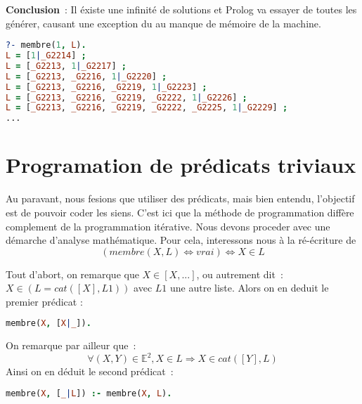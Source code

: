 \textbf{Conclusion}~: Il éxiste une infinité de solutions et Prolog va essayer
de toutes les générer, causant une exception du au manque de mémoire de la
machine.

\begin{lstlisting}[language=Prolog,frame=single]
?- membre(1, L).
L = [1|_G2214] ;
L = [_G2213, 1|_G2217] ;
L = [_G2213, _G2216, 1|_G2220] ;
L = [_G2213, _G2216, _G2219, 1|_G2223] ;
L = [_G2213, _G2216, _G2219, _G2222, 1|_G2226] ;
L = [_G2213, _G2216, _G2219, _G2222, _G2225, 1|_G2229] ;
...
\end{lstlisting}


\section{Programation de prédicats triviaux}

Au paravant, nous fesions que utiliser des prédicats, mais bien entendu,
l'objectif est de pouvoir coder les siens. C'est ici que la méthode de programmation diffère
complement de la programmation itérative. Nous devons proceder avec une démarche
d'analyse mathématique. Pour cela, interessons nous à la ré-écriture de
\[(membre(X, L) \Leftrightarrow vrai) \Leftrightarrow X \in L\]

Tout d'abort, on remarque que $X \in [X, ...]$, ou autrement dit~:
$X \in (L = cat([X], L1))$ avec $L1$ une autre liste. Alors on en deduit le
premier prédicat :
\begin{lstlisting}[language=Prolog,frame=single]
membre(X, [X|_]).
\end{lstlisting}

On remarque par ailleur que~:
\[\forall (X, Y) \in \mathbb{E}^2, X \in L \Rightarrow X \in cat([Y], L)\]
Ainsi on en déduit le second prédicat~:
\begin{lstlisting}[language=Prolog,frame=single]
membre(X, [_|L]) :- membre(X, L).
\end{lstlisting}
